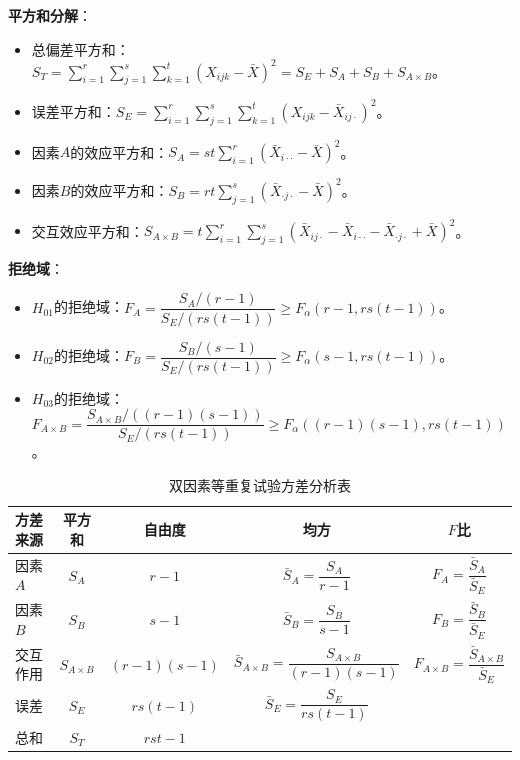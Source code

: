 \documentclass[11pt,a4paper]{report}
\theoremstyle{definition}
\theoremstyle{plain}
\begin{document}
\textbf{平方和分解}：
\begin{itemize}[leftmargin=2em]
    \item 总偏差平方和：$S_T=\sum_{i=1}^{r}\sum_{j=1}^{s}\sum_{k=1}^{t}(X_{ijk}-\bar{X})^2=S_E+S_A+S_B+S_{A\times B}$。
    \item 误差平方和：$S_E=\sum_{i=1}^{r}\sum_{j=1}^{s}\sum_{k=1}^{t}(X_{ijk}-\bar{X}_{ij\cdot})^2$。
    \item 因素$A$的效应平方和：$S_A=st\sum_{i=1}^{r}(\bar{X}_{i\cdot\cdot}-\bar{X})^2$。
    \item 因素$B$的效应平方和：$S_B=rt\sum_{j=1}^{s}(\bar{X}_{\cdot j\cdot}-\bar{X})^2$。
    \item 交互效应平方和：$S_{A\times B}=t\sum_{i=1}^{r}\sum_{j=1}^{s}(\bar{X}_{ij\cdot}-\bar{X}_{i\cdot\cdot}-\bar{X}_{\cdot j\cdot}+\bar{X})^2$。
\end{itemize}

\textbf{拒绝域}：
\begin{itemize}[leftmargin=2em]
    \item $H_{01}$的拒绝域：$F_A=\dfrac{S_A/(r-1)}{S_E/(rs(t-1))}\geq F_\alpha(r-1,rs(t-1))$。
    \item $H_{02}$的拒绝域：$F_B=\dfrac{S_B/(s-1)}{S_E/(rs(t-1))}\geq F_\alpha(s-1,rs(t-1))$。
    \item $H_{03}$的拒绝域：$F_{A\times B}=\dfrac{S_{A\times B}/((r-1)(s-1))}{S_E/(rs(t-1))}\geq F_\alpha((r-1)(s-1),rs(t-1))$。
\end{itemize}

\begin{table}[htbp]
\centering
\caption{双因素等重复试验方差分析表}
\begin{tabular}{@{}lcccc@{}}
\toprule
\textbf{方差来源} & \textbf{平方和} & \textbf{自由度} & \textbf{均方} & \textbf{$F$比} \\
\midrule
因素$A$ & $S_A$ & $r-1$ & $\bar{S}_A=\dfrac{S_A}{r-1}$ & $F_A=\dfrac{\bar{S}_A}{\bar{S}_E}$ \\
因素$B$ & $S_B$ & $s-1$ & $\bar{S}_B=\dfrac{S_B}{s-1}$ & $F_B=\dfrac{\bar{S}_B}{\bar{S}_E}$ \\
交互作用 & $S_{A\times B}$ & $(r-1)(s-1)$ & $\bar{S}_{A\times B}=\dfrac{S_{A\times B}}{(r-1)(s-1)}$ & $F_{A\times B}=\dfrac{\bar{S}_{A\times B}}{\bar{S}_E}$ \\
误差 & $S_E$ & $rs(t-1)$ & $\bar{S}_E=\dfrac{S_E}{rs(t-1)}$ & \\
总和 & $S_T$ & $rst-1$ & & \\
\bottomrule
\end{tabular}
\end{table}
\end{document}
